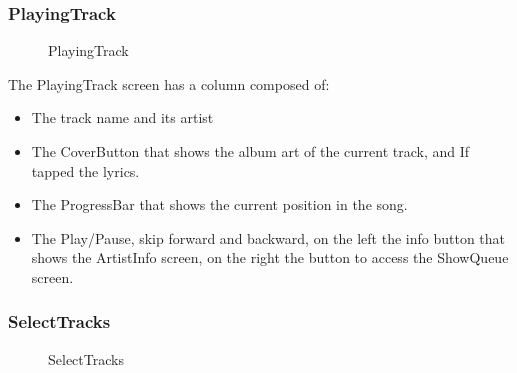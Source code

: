 \documentclass{article}
\begin{document}
\subsubsection{PlayingTrack}

\begin{figure}[H]
	\noindent
	\caption{PlayingTrack}
\end{figure}

The PlayingTrack screen has a column composed of:
\begin{itemize}
    \item The track name and its artist
    \item The CoverButton that shows the album art of the current track, and If
        tapped the lyrics.
    \item The ProgressBar that shows the current position in the song.
    \item The Play/Pause, skip forward and backward, on the left the info button
        that shows the ArtistInfo screen, on the right the button to access the
        ShowQueue screen.
\end{itemize}

\subsubsection{SelectTracks}

\begin{figure}[H]
	\noindent
	\caption{SelectTracks}
\end{figure}
\end{document}
